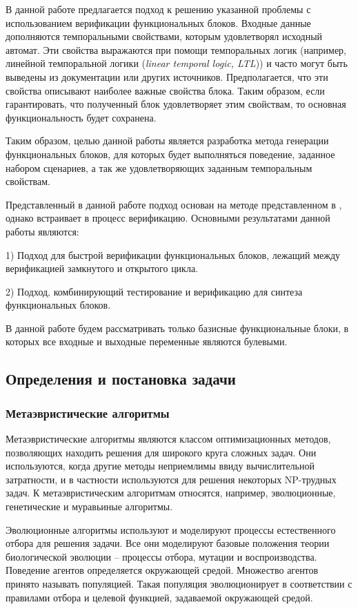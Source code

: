 \documentclass[14pt]{article}
\begin{document}
В данной работе предлагается подход к решению указанной проблемы с использованием верификации
функциональных блоков. Входные данные дополняются темпоральными свойствами,
которым удовлетворял исходный автомат. Эти свойства выражаются при помощи
темпоральных логик (например, линейной темпоральной логики (\textit{linear temporal logic, LTL})) и часто могут быть
выведены из документации или других источников. Предполагается, что эти
свойства описывают наиболее важные свойства блока. Таким образом, если 
гарантировать, что полученный блок удовлетворяет этим свойствам, то
основная функциональность будет сохранена.

Таким образом, целью данной работы является разработка метода генерации
функциональных блоков, для которых будет выполняться поведение, заданное
набором сценариев, а так же удовлетворяющих заданным темпоральным свойствам.

Представленный в данной работе подход основан на методе представленном в \cite{rec},
однако встраивает в процесс верификацию. Основными результатами данной работы
являются:

1) Подход для быстрой верификации функциональных блоков, лежащий между
верификацией замкнутого и открытого цикла.

2) Подход, комбинирующий тестирование и верификацию для синтеза функциональных
блоков.

В данной работе будем рассматривать только базисные функциональные блоки, в которых
все входные и выходные переменные являются булевыми.

\pagebreak

\subsection{Определения и постановка задачи}

\subsubsection{Метаэвристические алгоритмы}

Метаэвристические алгоритмы \cite{meh} являются классом оптимизационных методов,
позволяющих находить решения для широкого круга сложных задач. Они используются,
когда другие методы неприемлимы ввиду вычислительной затратности, и в частности
используются для решения некоторых NP-трудных задач. К метаэвристическим алгоритмам относятся, например,
эволюционные, генетические и муравьиные алгоритмы.

Эволюционные алгоритмы используют и моделируют процессы естественного отбора
для решения задачи. Все они моделируют базовые положения теории биологической
эволюции -- процессы отбора, мутации и воспроизводства. Поведение агентов
определяется окружающей средой. Множество агентов принято называть популяцией.
Такая популяция эволюционирует в соответствии с правилами отбора и целевой функцией, задаваемой окружающей средой.
\end{document}
